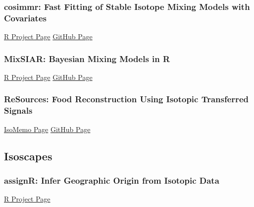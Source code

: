 \documentclass[
  letterpaper,
  DIV=11,
  numbers=noendperiod]{scrreprt}
\begin{document}
\subsubsection*{cosimmr: Fast Fitting of Stable Isotope Mixing Models
with
Covariates}\label{cosimmr-fast-fitting-of-stable-isotope-mixing-models-with-covariates}

\href{https://CRAN.R-project.org/package=cosimmr}{R Project Page}
\textbar{} \href{https://github.com/emmagovan/cosimmr}{GitHub Page}

\subsubsection*{MixSIAR: Bayesian Mixing Models in
R}\label{mixsiar-bayesian-mixing-models-in-r}

\href{https://CRAN.R-project.org/package=MixSIAR}{R Project Page}
\textbar{} \href{https://github.com/brianstock/MixSIAR}{GitHub Page}

\subsubsection*{ReSources: Food Reconstruction Using Isotopic
Transferred
Signals}\label{resources-food-reconstruction-using-isotopic-transferred-signals}

\href{https://pandora-isomemo.github.io/docs/apps.html}{IsoMemo Page}
\textbar{} \href{https://github.com/Pandora-IsoMemo/ReSources}{GitHub
Page}

\subsection*{Isoscapes}\label{isoscapes}

\subsubsection*{assignR: Infer Geographic Origin from Isotopic
Data}\label{assignr-infer-geographic-origin-from-isotopic-data}

\href{https://CRAN.R-project.org/package=assignR}{R Project Page}
\end{document}

